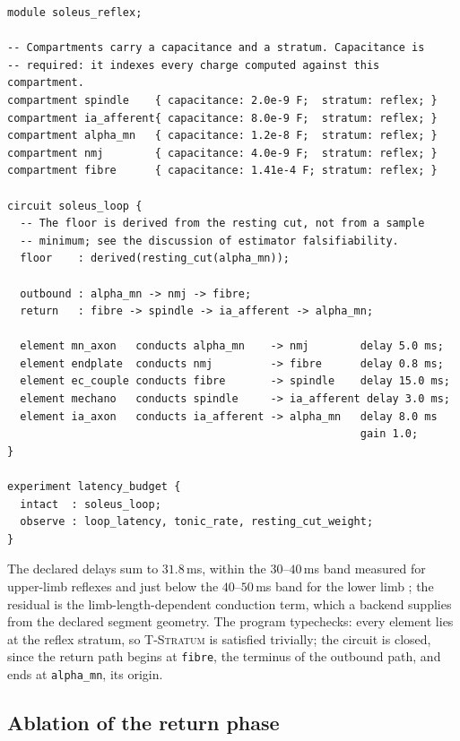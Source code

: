 \documentclass[11pt,twocolumn,a4paper]{article}
\theoremstyle{thmstyle}
\theoremstyle{definition}
\theoremstyle{remark}
\begin{document}
\begin{lstlisting}[style=vvs,caption={\texttt{soleus\_reflex.vvs} --- a closed
monosynaptic loop.},label={lst:reflex}]
module soleus_reflex;

-- Compartments carry a capacitance and a stratum. Capacitance is
-- required: it indexes every charge computed against this compartment.
compartment spindle    { capacitance: 2.0e-9 F;  stratum: reflex; }
compartment ia_afferent{ capacitance: 8.0e-9 F;  stratum: reflex; }
compartment alpha_mn   { capacitance: 1.2e-8 F;  stratum: reflex; }
compartment nmj        { capacitance: 4.0e-9 F;  stratum: reflex; }
compartment fibre      { capacitance: 1.41e-4 F; stratum: reflex; }

circuit soleus_loop {
  -- The floor is derived from the resting cut, not from a sample
  -- minimum; see the discussion of estimator falsifiability.
  floor    : derived(resting_cut(alpha_mn));

  outbound : alpha_mn -> nmj -> fibre;
  return   : fibre -> spindle -> ia_afferent -> alpha_mn;

  element mn_axon   conducts alpha_mn    -> nmj        delay 5.0 ms;
  element endplate  conducts nmj         -> fibre      delay 0.8 ms;
  element ec_couple conducts fibre       -> spindle    delay 15.0 ms;
  element mechano   conducts spindle     -> ia_afferent delay 3.0 ms;
  element ia_axon   conducts ia_afferent -> alpha_mn   delay 8.0 ms
                                                       gain 1.0;
}

experiment latency_budget {
  intact  : soleus_loop;
  observe : loop_latency, tonic_rate, resting_cut_weight;
}
\end{lstlisting}

The declared delays sum to $31.8$\,ms, within the $30$--$40$\,ms band measured
for upper-limb reflexes and just below the $40$--$50$\,ms band for the lower
limb \citep{matthews1990}; the residual is the limb-length-dependent
conduction term, which a backend supplies from the declared segment geometry.
The program typechecks: every element lies at the reflex stratum, so
\textsc{T-Stratum} is satisfied trivially; the circuit is closed, since the
return path begins at \texttt{fibre}, the terminus of the outbound path, and
ends at \texttt{alpha\_mn}, its origin.

\subsection{Ablation of the return phase}
\end{document}

